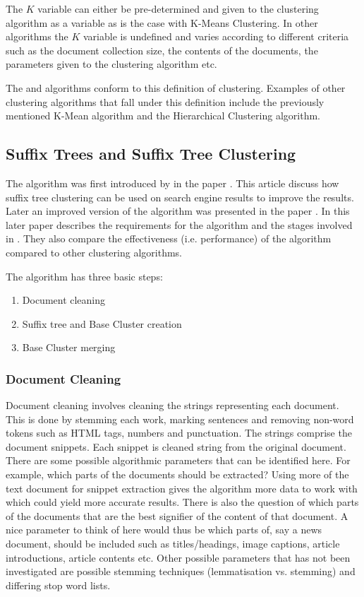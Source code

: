 The \(K\) variable can either be pre-determined and given to the clustering algorithm as a variable as is the case with K-Means Clustering. In other algorithms the \(K\) variable is undefined and varies according to different criteria such as the document collection size, the contents of the documents, the parameters given to the clustering algorithm etc.

The \STC and \CTC algorithms conform to this definition of clustering. Examples of other clustering algorithms that fall under this definition include the previously mentioned K-Mean algorithm and the Hierarchical Clustering algorithm.

\subsection{Suffix Trees and Suffix Tree Clustering}
The \STC algorithm was first introduced by \textcite{Oren1997} in the paper . This article discuss how suffix tree clustering can be used on search engine results to improve the results. Later an improved version of the algorithm was presented in the paper  \cite{Oren1998}. In this later paper \citeauthor{Oren1998} describes the requirements for the \STC algorithm and the stages involved in \STC. They also compare the effectiveness (i.e. performance) of the algorithm compared to other clustering algorithms.

The \STC algorithm has three basic steps:
\begin{enumerate}
\item Document cleaning
\item Suffix tree and Base Cluster creation
\item Base Cluster merging
\end{enumerate}

\subsubsection{Document Cleaning}

Document cleaning involves cleaning the strings representing each document. This is done by stemming each work, marking sentences and removing non-word tokens such as HTML tags, numbers and punctuation. The strings comprise the document snippets. Each snippet is cleaned string from the original document. There are some possible algorithmic parameters that can be identified here. For example, which parts of the documents should be extracted? Using more of the text document for snippet extraction gives the algorithm more data to work with which could yield more accurate results. There is also the question of which parts of the documents that are the best signifier of the content of that document. A nice parameter to think of here would thus be which parts of, say a news document, should be included such as titles/headings, image captions, article introductions, article contents etc. Other possible parameters that has not been investigated are possible stemming techniques (lemmatisation vs. stemming) and differing stop word lists.

